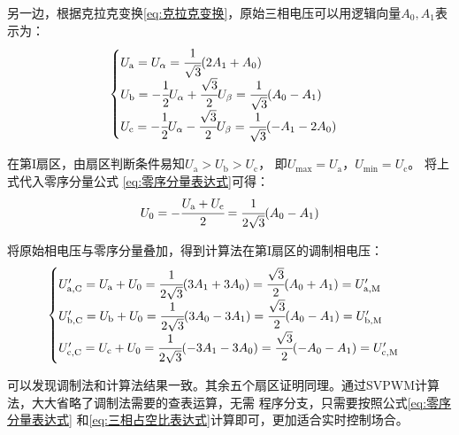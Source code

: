 另一边，根据克拉克变换\eqref{eq:克拉克变换}，原始三相电压可以用逻辑向量\(A_0,A_1\)表示为：
\begin{equation*}
    \begin{cases}
        U_{\mathrm{a}} = U_{\mathrm{\alpha}}
        = \cfrac{1}{\sqrt{3}}(2A_1 + A_0)\\
        U_{\mathrm{b}} = -\cfrac{1}{2}U_{\mathrm{\alpha}} + \cfrac{\sqrt{3}}{2}U_{\mathrm{\beta}}
        = \cfrac{1}{\sqrt{3}}(A_0-A_1)\\
        U_{\mathrm{c}} = -\cfrac{1}{2}U_{\mathrm{\alpha}} - \cfrac{\sqrt{3}}{2}U_{\mathrm{\beta}}
        = \cfrac{1}{\sqrt{3}}(-A_1-2A_0)
    \end{cases}
\end{equation*}

在第I扇区，由扇区判断条件易知\(U_{\mathrm{a}}>U_{\mathrm{b}}>U_{\mathrm{c}}\)，
即\(U_{\mathrm{\max}}=U_{\mathrm{a}}\)，\(U_{\mathrm{\min}}=U_{\mathrm{c}}\)。
将上式代入零序分量公式
\eqref{eq:零序分量表达式}可得：
\begin{equation*}
    U_{\mathrm{0}} = -\cfrac{U_{\mathrm{a}} + U_{\mathrm{c}}}{2} = \cfrac{1}{2\sqrt{3}}(A_0-A_1)
\end{equation*}

将原始相电压与零序分量叠加，得到计算法在第I扇区的调制相电压：
\begin{equation*}
    \begin{cases}
        U_{\mathrm{a,C}}'=U_{\mathrm{a}}+U_{\mathrm{0}}
        =\cfrac{1}{2\sqrt{3}}(3A_1+3A_0)=\cfrac{\sqrt{3}}{2}(A_0 + A_1)=U_{\mathrm{a,M}}'\\
        U_{\mathrm{b,C}}'=U_{\mathrm{b}}+U_{\mathrm{0}}
        =\cfrac{1}{2\sqrt{3}}(3A_0-3A_1)=\cfrac{\sqrt{3}}{2}(A_0 - A_1)=U_{\mathrm{b,M}}'\\
        U_{\mathrm{c,C}}'=U_{\mathrm{c}}+U_{\mathrm{0}} 
        =\cfrac{1}{2\sqrt{3}}(-3A_1-3A_0)=\cfrac{\sqrt{3}}{2}(-A_0 - A_1)=U_{\mathrm{c,M}}'\\
    \end{cases}
\end{equation*}

可以发现调制法和计算法结果一致。其余五个扇区证明同理。通过SVPWM计算法，大大省略了调制法需要的查表运算，无需
程序分支，只需要按照公式\eqref{eq:零序分量表达式}
和\eqref{eq:三相占空比表达式}计算即可，更加适合实时控制场合。
